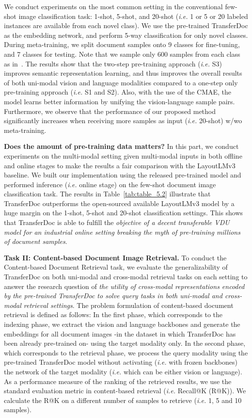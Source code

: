 \documentclass[preprint,review,12pt]{elsarticle}
\newcommand{\ie}{\textit{i.e. }}
\begin{document}
We conduct experiments on the most common setting in the conventional few-shot image classification task: 1-shot, 5-shot, and 20-shot (\ie 1 or 5 or 20 labeled instances are available from each novel class). We use the pre-trained TransferDoc as the embedding network, and perform 5-way classification for only novel classes. During meta-training, we split document samples onto 9 classes for fine-tuning, and 7 classes for testing. Note that we sample only 600 samples from each class as in~\cite{dhillon2019baseline}. The results show that the two-step pre-training approach (\ie S3) improves semantic representation learning, and thus improves the overall results of both uni-modal vision and language modalities compared to a one-step only pre-training approach (\ie S1 and S2). Also, with the use of the CMAE, the model learns better information by unifying the vision-language sample pairs. Furthermore, we observe that the performance of our proposed method significantly increases when receiving more samples as input (\ie 20-shot) w/wo meta-training. 

\noindent\textbf{Does the amount of pre-training data matters?} In this part, we conduct experiments on the multi-modal setting given multi-modal inputs in both offline and online stages to make the results a fair comparison with the LayoutLMv3~\cite{huang2022layoutlmv3} baseline. We built our implementation using the released pre-trained model and performed inference (\ie online stage) on the few-shot document image classification task. The results in Table~\ref{tab:table_5.2} illustrate that TransferDoc outperforms the open-sourced available LayoutLMv3 model by a huge margin on the 1-shot, 5-shot and 20-shot classification settings. This shows that TransferDoc is able to fulfill the \textit{objective of a decent transferable VDU model for an industrial online setting breaking the myth of pre-training millions of document samples}.  



\noindent\textbf{Task II: Content-based Document Image Retrieval.}
To conduct the Content-based Document Retrieval task, we evaluate the generalizability of TransferDoc on both uni-modal and cross-modal retrieval tasks on each setting to answer the research question of \textit{the utility of cross-modal representations encoded by the pre-trained TransferDoc to solve query tasks in both uni-modal and cross-modal retrieval settings}. The problem formulation of content-based document retrieval is defined as follows: In the first phase, which corresponds to the indexing phase, we extract the vision and language backbones and generate the embeddings for all document images -in the dataset in which TransferDoc has been already pre-trained on- using the target modality only. In the second phase, which corresponds to the retrieval phase, we process the query modality using the pre-trained TransferDoc model without activating (\ie with frozen backbones) the network of the target modality (\ie which can be either vision or language). 
As a performance measure of the ranking of the retrieved results, we use the standard evaluation metric in content-based retrieval (\ie Recall@K (R@K)). We calculate the R@K on a different number of samples to retrieve (\ie 1, 5 and 10 samples). 
\end{document}
